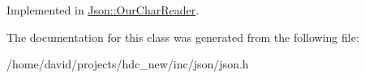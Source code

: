 Implemented in \hyperlink{class_json_1_1_our_char_reader_a547f08ec5a9951ca69e8bb2e90296c83}{Json\+::\+Our\+Char\+Reader}.



The documentation for this class was generated from the following file\+:\begin{DoxyCompactItemize}
\item 
/home/david/projects/hdc\+\_\+new/inc/json/json.\+h\end{DoxyCompactItemize}
